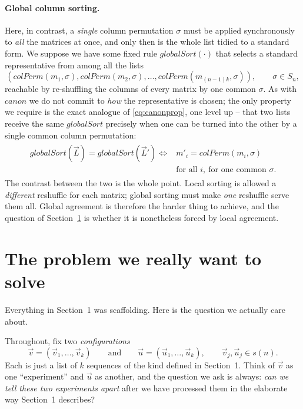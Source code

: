 \documentclass{article}
\begin{document}
\paragraph{Global column sorting.}
Here, in contrast, a \emph{single} column permutation $\sigma$ must be applied
synchronously to \emph{all} the matrices at once, and only then is the whole list
tidied to a standard form.  We suppose we have some fixed rule $globalSort(\cdot)$
that selects a standard representative from among all the lists
$$
\left(
colPerm(m_1, \sigma), colPerm(m_2, \sigma), \ldots, colPerm(m_{(n-1)k},\sigma)
\right),
\qquad \sigma\in S_n,
$$
reachable by re-shuffling the columns of every matrix by one common $\sigma$.  As
with $canon$ we do not commit to \emph{how} the representative is chosen; the only
property we require is the exact analogue of \eqref{eq:canonprop}, one level up --
that two lists receive the same $globalSort$ precisely when one can be turned into
the other by a single common column permutation:
\begin{align}
\begin{split}
globalSort(\vec L)=globalSort(\vec L')
\iff{}& m'_i=colPerm(m_i,\sigma)\\[-2pt]
& \text{for all }i,\ \text{for one common }\sigma.
\end{split}
\label{eq:globalprop}
\end{align}
The contrast between the two is the whole point.  Local sorting is allowed a
\emph{different} reshuffle for each matrix; global sorting must make \emph{one}
reshuffle serve them all.  Global agreement is therefore the harder thing to
achieve, and the question of Section~\ref{sec:problem} is whether it is nonetheless
forced by local agreement.


\section{The problem we really want to solve}
\label{sec:problem}

Everything in Section~1 was scaffolding.  Here is the question we actually
care about.

\label{def:config}Throughout, fix two \emph{configurations}
\[
\vec v=(\vec v_1,\ldots,\vec v_k)
\qquad\text{and}\qquad
\vec u=(\vec u_1,\ldots,\vec u_k),
\qquad \vec v_j,\vec u_j\in s(n).
\]
Each is just a list of $k$ sequences of the kind defined in Section~1.  Think of
$\vec v$ as one ``experiment'' and $\vec u$ as another, and the question we ask is
always: \emph{can we tell these two experiments apart} after we have processed
them in the elaborate way Section~1 describes?
\end{document}

